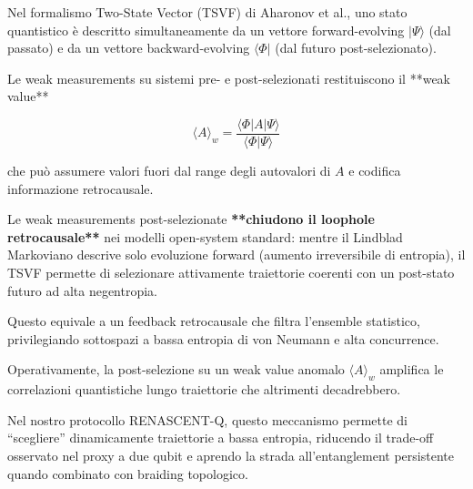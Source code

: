 \documentclass[11pt,a4paper]{article}
\theoremstyle{plain}
\theoremstyle{definition}
\begin{document}
\vspace{0.2cm}

Nel formalismo Two-State Vector (TSVF) di Aharonov et al., uno stato quantistico è descritto simultaneamente da un vettore forward-evolving \(|\Psi\rangle\) (dal passato) e da un vettore backward-evolving \(\langle\Phi|\) (dal futuro post-selezionato). 


\vspace{0.4cm}


Le weak measurements su sistemi pre- e post-selezionati restituiscono il **weak value**

\[
\langle A \rangle_w = \frac{\langle \Phi | A | \Psi \rangle}{\langle \Phi | \Psi \rangle}
\]

\vspace{0.2cm}

che può assumere valori fuori dal range degli autovalori di \(A\) e codifica informazione retrocausale.



\vspace{0.4cm}

Le weak measurements post-selezionate \textbf{**chiudono il loophole retrocausale**} nei modelli open-system standard: mentre il Lindblad Markoviano descrive solo evoluzione forward (aumento irreversibile di entropia), il TSVF permette di selezionare attivamente traiettorie coerenti con un post-stato futuro ad alta negentropia. 


\vspace{0.3cm}


Questo equivale a un feedback retrocausale che filtra l'ensemble statistico, privilegiando sottospazi a bassa entropia di von Neumann e alta concurrence.


\vspace{0.3cm}

Operativamente, la post-selezione su un weak value anomalo \(\langle A \rangle_w\) amplifica le correlazioni quantistiche lungo traiettorie che altrimenti decadrebbero. 



\vspace{0.5cm}



Nel nostro protocollo RENASCENT-Q, questo meccanismo permette di “scegliere” dinamicamente traiettorie a bassa entropia, riducendo il trade-off osservato nel proxy a due qubit e aprendo la strada all'entanglement persistente quando combinato con braiding topologico.
\end{document}
